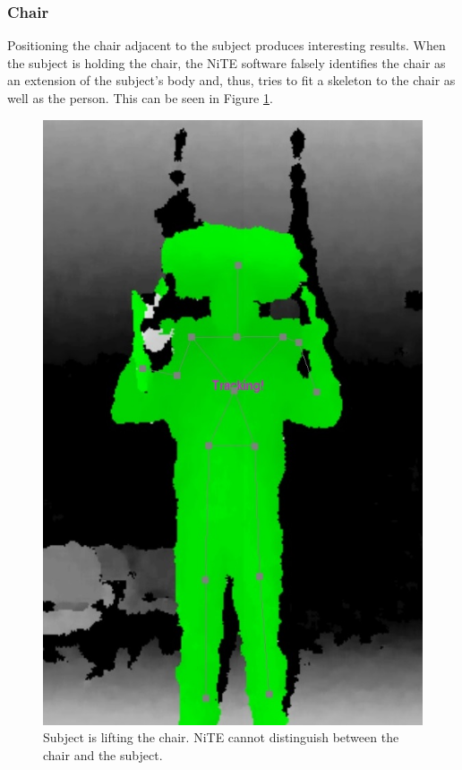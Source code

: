 \documentclass[a4paper]{article}
\begin{document}
\subsubsection{Chair}
\noindent Positioning the chair adjacent to the subject produces interesting results. When the subject is holding the chair, the NiTE software falsely identifies the chair as an extension of the subject's body and, thus, tries to fit a skeleton to the chair as well as the person. This can be seen in Figure \ref{lifting_chair}.

\begin{figure}[H]
\center
\includegraphics[scale=0.2]{Head_Chair.jpg} 
\caption{Subject is lifting the chair. NiTE cannot distinguish between the chair and the subject.}
\label{lifting_chair}
\end{figure}
\end{document}
